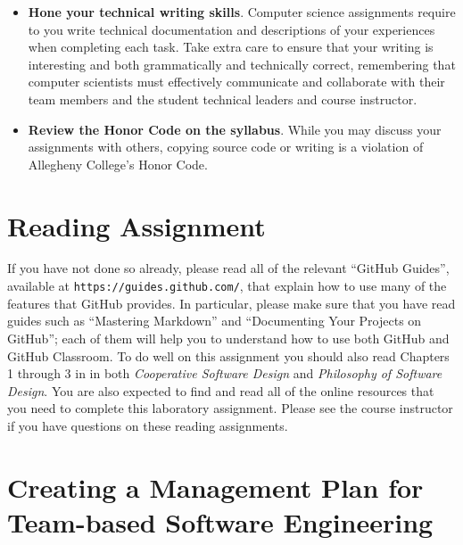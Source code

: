 \documentclass[11pt]{article}
\newcommand{\cooperative}{{\em Cooperative Software Design\/}}
\newcommand{\philosophy}{{\em Philosophy of Software Design\/}}
\newcommand{\url}[1]{\lstinline{#1}}
\begin{document}
\begin{itemize}
\item {\bf Hone your technical writing skills}. Computer science assignments
  require to you write technical documentation and descriptions of your
  experiences when completing each task. Take extra care to ensure that your
  writing is interesting and both grammatically and technically correct,
  remembering that computer scientists must effectively communicate and
  collaborate with their team members and the student technical leaders and
  course instructor.

\item {\bf Review the Honor Code on the syllabus}. While you may discuss your
  assignments with others, copying source code or writing is a violation of
  Allegheny College's Honor Code.

\end{itemize}

\section*{Reading Assignment}



If you have not done so already, please read all of the relevant ``GitHub
Guides'', available at \url{https://guides.github.com/}, that explain how to use
many of the features that GitHub provides. In particular, please make sure that
you have read guides such as ``Mastering Markdown'' and ``Documenting Your
Projects on GitHub''; each of them will help you to understand how to use both
GitHub and GitHub Classroom.
%
To do well on this assignment you should also read Chapters 1 through 3 in in
both \cooperative{} and \philosophy{}.
%
You are also expected to find and read all of the online resources that you need
to complete this laboratory assignment.
%
Please see the course instructor if you have questions on these reading
assignments.

\section*{Creating a Management Plan for Team-based Software Engineering}

\end{document}
